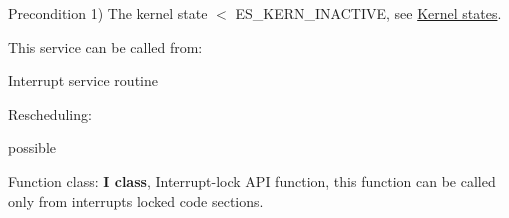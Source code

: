 \begin{DoxyPrecond}{Precondition}
1) {\ttfamily The kernel state $<$ E\-S\-\_\-\-K\-E\-R\-N\-\_\-\-I\-N\-A\-C\-T\-I\-V\-E}, see \hyperlink{states}{Kernel states}. 
\end{DoxyPrecond}
\begin{DoxyParagraph}{This service can be called from\-:}

\begin{DoxyItemize}
\item Interrupt service routine 
\end{DoxyItemize}
\end{DoxyParagraph}
\begin{DoxyParagraph}{Rescheduling\-:}

\begin{DoxyItemize}
\item possible 
\end{DoxyItemize}
\end{DoxyParagraph}
\begin{DoxyParagraph}{Function class\-:}
{\bfseries I class}, Interrupt-\/lock A\-P\-I function, this function can be called only from interrupts locked code sections. 
\end{DoxyParagraph}
